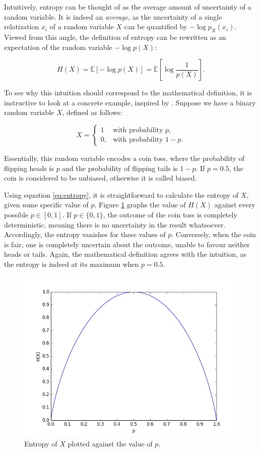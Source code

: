 \documentclass[12pt]{article}
\begin{document}
Intuitively, entropy can be thought of as the average amount of uncertainty of a random variable. It is indeed an \textit{average}, as the uncertainty of a single relatization $x_i$ of a random variable $X$ can be quantified by $-\log p_X(x_i)$. Viewed from this angle, the definition of entropy can be rewritten as an expectation of the random variable $-\log p(X)$: 

$$H(X) = \mathbb{E} \left[ - \log p(X) \right] = \mathbb{E} \left[ \log \frac{1}{p(X)} \right].$$

To see why this intuition should correspond to the mathematical definition, it is instructive to look at a concrete example, inspired by \cite{cover-thomas}. Suppose we have a binary random variable $X$, defined as follows: 

$$X = \begin{cases} 1 & \mbox{with probability } p, \\ 0, & \mbox{with probability } 1-p. \end{cases}$$

Essentially, this random variable encodes a coin toss, where the probability of flipping heads is $p$ and the probability of flipping tails is $1-p$. If $p=0.5$, the coin is considered to be unbiased, otherwise it is called biased.

Using equation \ref{eq:entropy}, it is straightforward to calculate the entropy of $X$, given some specific value of $p$. Figure \ref{fig:entropy} graphs the value of $H(X)$ against every possible $p \in \left[ 0, 1 \right]$. If $p \in \{0, 1\}$, the outcome of the coin toss is completely deterministic, meaning there is no uncertainty in the result whatsoever. Accordingly, the entropy vanishes for these values of $p$. Conversely, when the coin is fair, one is completely uncertain about the outcome, unable to favour neither heads or tails. Again, the mathematical definition agrees with the intuition, as the entropy is indeed at its maximum when $p = 0.5$.

\begin{figure} [h]
\begin{center}
\includegraphics[width=\textwidth]{entropy}
\caption{Entropy of $X$ plotted against the value of $p$.}
\label{fig:entropy}
\end{center}
\end{figure}
\end{document}
